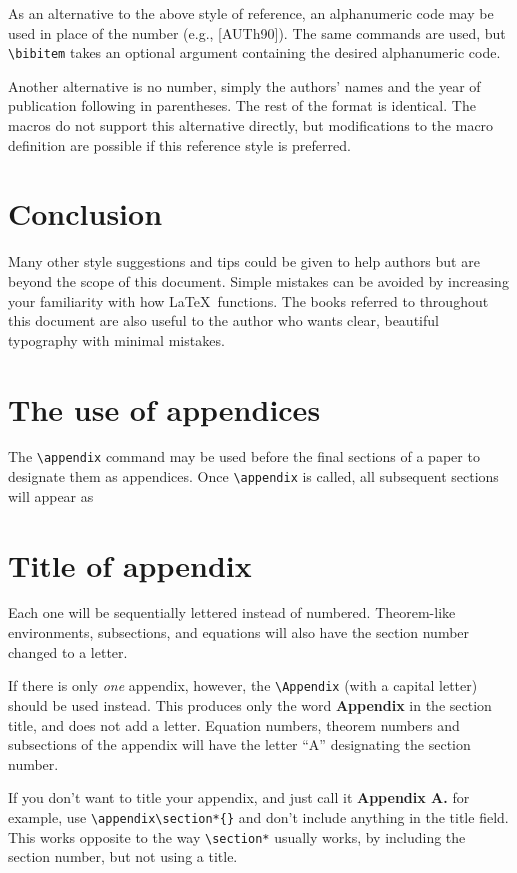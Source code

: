 \documentclass[final,leqno,onefignum,onetabnum]{siamltex1213}
\begin{document}
As an alternative to the above style of reference, an alphanumeric
code may be used in place of the number (e.g., [AUTh90]). The same
commands are used, but \verb|\bibitem| takes an optional argument
containing the desired alphanumeric code. 

Another alternative is no number, simply the authors' names and
the year of publication following in parentheses. The rest of the
format is identical. The macros do not support this alternative
directly, but modifications to the macro definition are possible
if this reference style is preferred.


\section{Conclusion} Many other style suggestions and tips
could be given to help authors but are beyond the scope of this
document. Simple mistakes can be avoided by increasing your familiarity
with how \LaTeX\ functions. The books referred to throughout this document
are also useful to the author who wants clear, beautiful typography
with minimal mistakes. 

\Appendix
\section{The use of appendices}
The \verb|\appendix| command may be used before the final sections
of a paper to designate them as appendices. Once \verb|\appendix|
is called, all subsequent sections will appear as 

\appendix
\section{Title of appendix} Each one will be sequentially lettered
instead of numbered. Theorem-like environments, subsections,
and equations will also have the section number changed to a letter.

If there is only {\em one} appendix, however, the \verb|\Appendix|
(with a capital letter) should be used instead. This produces only 
the word {\bf Appendix} in the section title, and does not add a letter.
Equation numbers, theorem numbers and subsections of the appendix
will have the letter ``A''  designating the section number.

If you don't want to title your appendix, and just call it
{\bf Appendix A.} for example, use \verb|\appendix\section*{}| 
and don't include anything in the title field. This works
opposite to the way \verb|\section*| usually works, by including the
section number, but not using a title.
\end{document}
